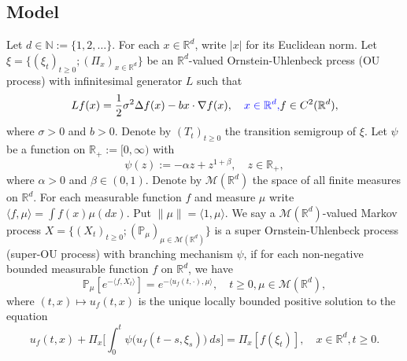 \documentclass[12pt,oneside,english]{amsart}
\theoremstyle{plain}
\theoremstyle{definition}
\numberwithin{equation}{section}
\newcommand{\added}[1]{{\color{blue}#1}}\newcommand{\deleted}[1]{{\color{red}#1}}
\begin{document}
\subsection{Model}
    Let $d \in \mathbb N:= \{1,2,\dots\}$.
    \deleted{For each $x\in \mathbb{R}^d$, write $|x|$ for its Euclidean norm.}
    Let $\xi=\{(\xi_t)_{t\geq 0}; (\Pi_x)_{x\in \mathbb R^d}\}$ be an $\mathbb R^d$-valued Ornstein-Uhlenbeck prcess (OU process) with infinitesimal generator $L$ such that
\begin{equation}
\label{eq: OU generator}
    Lf(x)
        = \frac{1}{2}\sigma^2\Delta f(x)-b x \cdot \nabla f(x),
        \quad \added{ x\in \mathbb R^d,}
        f \in C^2(\mathbb{R}^d),
\end{equation}
    where $\sigma>0$ and $b>0$.
    Denote by $(T_t)_{t\geq 0}$ the transition semigroup of $\xi$.
    Let $\psi$ be a function on $\mathbb R_+:= [0,\infty)$ with
\begin{equation}\label{mechanism}
    \psi(z)
        := - \alpha z + z^{1+\beta},
        \quad z \in \mathbb R_+,
\end{equation}
        where $\alpha > 0$ and $\beta \in (0,1) $.
    Denote by $\mathcal{M}(\mathbb{R}^d)$ the space of \added{ all} finite measures on $\mathbb{R}^d$.
    For each measurable function $f$ and measure $\mu$ write $\langle f,\mu\rangle = \int f(x)\mu(dx)$.
    Put $\|\mu\|=\langle 1,\mu\rangle$. 
    We say a $\mathcal{M}(\mathbb{R}^d)$-valued Markov process $X = \{(X_t)_{t\geq 0}; (\mathbb{P}_{\mu})_{\mu \in \mathcal M(\mathbb R^d)}\}$ is a super Ornstein-Uhlenbeck process (super-OU process) with branching mechanism $\psi$, if for each non-negative bounded measurable function $f$ on $\mathbb{R}^d$, we have
\begin{equation} \label{super}
    \mathbb{P}_{\mu}[e^{-\langle f,X_t \rangle}]
        = e^{-\langle u_f(t,\cdot), \mu \rangle},
        \quad t\geq 0, \mu \in \mathcal M(\mathbb R^d),
\end{equation}
        where $(t,x) \mapsto u_f(t,x)$ is the unique locally bounded positive solution to the equation
\begin{equation}\label{eq1}
        u_f(t,x) + \Pi_x \Big[ \int_0^t\psi\big(u_f(t-s, \xi_s)\big)~ds\Big]
        = \Pi_x [f(\xi_t)],
        \quad x\in \mathbb R^d, t\geq 0.
\end{equation}
\end{document}
